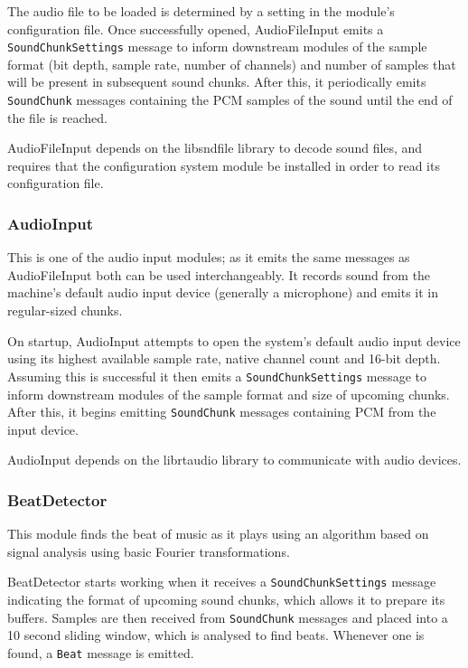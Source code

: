 \documentclass[english,12pt]{scrartcl}
\begin{document}
				The audio file to be loaded is determined by a setting in the module's
				configuration file. Once successfully opened, AudioFileInput emits a
				\texttt{SoundChunkSettings} message to inform downstream modules of the sample
				format (bit depth, sample rate, number of channels)	and number of samples that
				will be present in subsequent sound chunks. After this, it periodically emits
				\texttt{SoundChunk} messages containing the PCM samples of the sound until
				the end of the file is reached.
				
				AudioFileInput depends on the libsndfile library to decode sound files, and
				requires that the configuration system module be installed in order to read its
				configuration file.
			
			
			\subsubsection{AudioInput}
				This is one of the audio input modules; as it emits the same messages as
				AudioFileInput both can be used interchangeably. It records sound from the
				machine's default audio input device (generally a microphone) and emits it in
				regular-sized chunks.
				
				On startup, AudioInput attempts to open the system's default audio input device
				using its highest available sample rate, native channel count and 16-bit depth.
				Assuming this is successful it then emits a \texttt{SoundChunkSettings} message
				to inform downstream modules of the sample format and size of upcoming chunks.
				After this, it begins emitting \texttt{SoundChunk} messages containing PCM from
				the input device.
				
				AudioInput depends on the librtaudio library to communicate with audio devices.
				
				
			\subsubsection{BeatDetector}
				This module finds the beat of music as it plays using an algorithm based on signal analysis using basic Fourier transformations.
				
				BeatDetector starts working when it receives a \texttt{SoundChunkSettings} message
				indicating the format of upcoming sound chunks, which allows it to prepare its
				buffers. Samples are then received from \texttt{SoundChunk} messages and placed
				into a 10 second sliding window, which is analysed to find beats. Whenever one is
				found, a \texttt{Beat} message is emitted.
				
\end{document}
